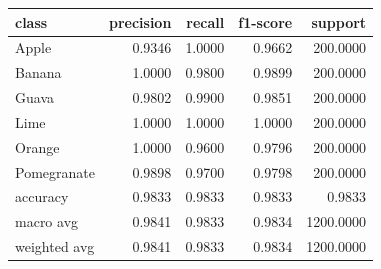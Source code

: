 \begin{tabular}{lrrrr}
\toprule
class & precision & recall & f1-score & support \\
\midrule
Apple & 0.9346 & 1.0000 & 0.9662 & 200.0000 \\
Banana & 1.0000 & 0.9800 & 0.9899 & 200.0000 \\
Guava & 0.9802 & 0.9900 & 0.9851 & 200.0000 \\
Lime & 1.0000 & 1.0000 & 1.0000 & 200.0000 \\
Orange & 1.0000 & 0.9600 & 0.9796 & 200.0000 \\
Pomegranate & 0.9898 & 0.9700 & 0.9798 & 200.0000 \\
accuracy & 0.9833 & 0.9833 & 0.9833 & 0.9833 \\
macro avg & 0.9841 & 0.9833 & 0.9834 & 1200.0000 \\
weighted avg & 0.9841 & 0.9833 & 0.9834 & 1200.0000 \\
\bottomrule
\end{tabular}
